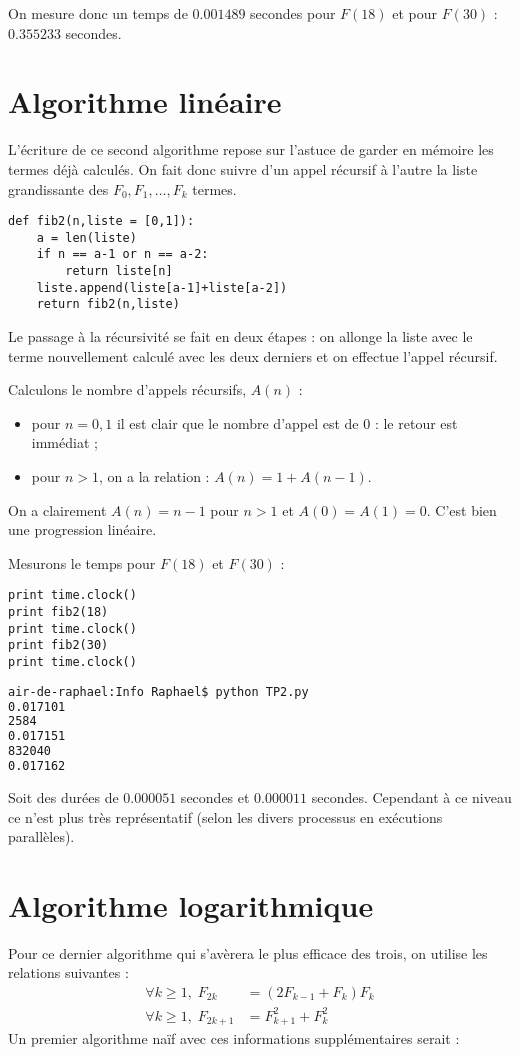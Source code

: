 \documentclass{mybourbaki}
\begin{document}
On mesure donc un temps de $0.001489$ secondes pour $F(18)$ et pour $F(30)$ : $0.355233$ secondes.

\section{Algorithme linéaire}
L'écriture de ce second algorithme repose sur \og l'astuce \fg{} de garder en mémoire les termes déjà calculés. On fait donc suivre d'un appel récursif à l'autre la liste grandissante des $F_0,F_1,\ldots,F_k$ termes.

\begin{lstlisting}[frame = single]
def fib2(n,liste = [0,1]):
	a = len(liste)
	if n == a-1 or n == a-2:
		return liste[n]
	liste.append(liste[a-1]+liste[a-2])
	return fib2(n,liste)
\end{lstlisting}

Le passage à la récursivité se fait en deux étapes : on allonge la liste avec le terme nouvellement calculé avec les deux derniers et on effectue l'appel récursif.

Calculons le nombre d'appels récursifs, $A(n)$ :
\begin{itemize}
\item pour $n=0,1$ il est clair que le nombre d'appel est de $0$ : le retour est immédiat ;
\item pour $n> 1$, on a la relation : $A(n) = 1 + A(n-1)$.
\end{itemize}
On a clairement $A(n) = n-1$ pour $n> 1$ et $A(0) = A(1) = 0$. C'est bien une progression linéaire.

Mesurons le temps pour $F(18)$ et $F(30)$ :
\begin{lstlisting}[frame = single]
print time.clock()
print fib2(18)
print time.clock()
print fib2(30)
print time.clock()
\end{lstlisting}
\begin{lstlisting}[frame=single,language=bash]
air-de-raphael:Info Raphael$ python TP2.py
0.017101
2584
0.017151
832040
0.017162
\end{lstlisting}
Soit des durées de $0.000051$ secondes et $0.000011$ secondes. Cependant à ce niveau ce n'est plus très représentatif (selon les divers processus en exécutions parallèles).

\section{Algorithme logarithmique}
Pour ce dernier algorithme qui s'avèrera le plus efficace des trois, on utilise les relations suivantes :
\begin{align*}
\forall k\geq 1, \; F_{2k} &= (2F_{k-1}+F_k)F_k \\
\forall k\geq 1, \; F_{2k+1} &= F_{k+1}^{2} + F_k^{2}
\end{align*}
Un premier algorithme \og naïf \fg{} avec ces informations supplémentaires serait :
\end{document}

